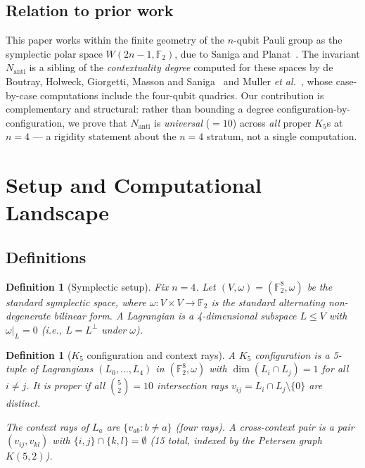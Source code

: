 \documentclass[11pt,a4paper]{article}
\newtheorem{definition}[theorem]{Definition}
\theoremstyle{remark}
\begin{document}
\subsection*{Relation to prior work}

This paper works within the finite geometry of the $n$-qubit Pauli group as the
symplectic polar space $W(2n-1,\mathbb{F}_2)$, due to Saniga and
Planat~\cite{SanigaPlanat}. The invariant $N_{\mathrm{anti}}$ is a sibling of the
\emph{contextuality degree} computed for these spaces by de Boutray, Holweck,
Giorgetti, Masson and Saniga~\cite{deBoutray} and Muller \emph{et
al.}~\cite{Muller}, whose case-by-case computations include the four-qubit
quadrics. Our contribution is complementary and structural: rather than bounding a
degree configuration-by-configuration, we prove that $N_{\mathrm{anti}}$ is
\emph{universal} ($=10$) across \emph{all} proper $K_5$s at $n=4$ --- a rigidity
statement about the $n=4$ stratum, not a single computation.


\section{Setup and Computational Landscape}\label{sec:setup}

\subsection{Definitions}

\begin{definition}[Symplectic setup]
Fix $n = 4$.
Let $(V, \omega) = (\mathbb{F}_2^8, \omega)$ be the standard symplectic space,
where $\omega \colon V \times V \to \mathbb{F}_2$ is the standard alternating
non-degenerate bilinear form.
A \emph{Lagrangian} is a 4-dimensional subspace $L \leq V$ with
$\omega|_L = 0$ (i.e., $L = L^\perp$ under $\omega$).
\end{definition}

\begin{definition}[$K_5$ configuration and context rays]
A \emph{$K_5$ configuration} is a 5-tuple of Lagrangians
$(L_0, \ldots, L_4)$ in $(\mathbb{F}_2^8, \omega)$ with
$\dim(L_i \cap L_j) = 1$ for all $i \neq j$.
It is \emph{proper} if all $\binom{5}{2} = 10$ intersection rays
$v_{ij} = L_i \cap L_j \setminus \{0\}$ are distinct.

The \emph{context rays of $L_a$} are $\{v_{ab} : b \neq a\}$ (four rays).
A \emph{cross-context pair} is a pair $(v_{ij}, v_{kl})$
with $\{i,j\} \cap \{k,l\} = \emptyset$ (15 total, indexed by the
Petersen graph $K(5,2)$).
\end{definition}
\end{document}
